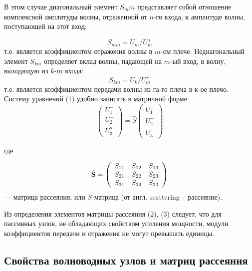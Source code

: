 ﻿\documentclass[a4paper,11pt]{article}
\begin{document}
В этом случае диагональный элемент $S_mm$ представляет собой отношение комплексной амплитуды волны, отраженной от $n$-го входа, к амплитуде волны, поступающей на этот вход:

\begin{equation}
	S _ { m m } = U _ { m } / U _ { m } ^ { + }
\end{equation}
т.е. является коэффициентом отражения волны в $m$-ом плече. Недиагональный элемент $S_{km}$ определяет вклад волны, падающей на $m$-ый вход, в волну, выходящую из $k$-го входа:
\begin{equation}
	S _ { k m } = U _ { k } / U _ { m } ^ { + }
\end{equation}
т.е. является коэффициентом передачи волны из га-го плеча в к-ое плечо. Систему уравнений (1) удобно записать в матричной форме
\begin{equation}
	\left( \begin{array} { c } { U _ { 1 } ^ { - } } \\ { U _ { 2 } ^ { - } } \\ { U _ { 3 } ^ { 2 } } \end{array} \right) = \hat { S } \left( \begin{array} { l } { U _ { 1 } ^ { + } } \\ { U _ { 2 } ^ { + } } \\ { U _ { 3 } ^ { + } } \end{array} \right)
\end{equation}

где

\begin{equation}
	\hat { \mathbf { S } } = \left( \begin{array} { c c c } { S _ { 11 } } & { S _ { 12 } } & { S _ { 13 } } \\ { S _ { 21 } } & { S _ { 22 } } & { S _ { 23 } } \\ { S _ { 31 } } & { S _ { 32 } } & { S _ { 33 } } \end{array} \right)
\end{equation}
--- матрица рассеяния, или $S$-матрица (от англ. scattering -- рассеяние).

Из определения элементов матрицы рассеяния (2), (3) следует, что для пассивных узлов, не обладающих свойством усиления мощности, модули коэффициентов передачи и отражения не могут превышать единицы.

\subsection{Свойства волноводных узлов и матриц рассеяния}
\end{document}
